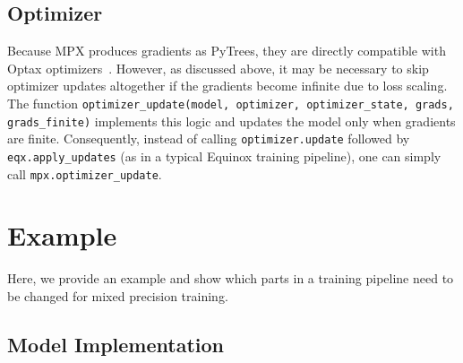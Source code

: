 \documentclass[10pt, a4paper, logo, onecolumn, internal, copyright]{dsme}
\begin{document}
\subsection{Optimizer}

Because MPX produces gradients as PyTrees, they are directly compatible with Optax optimizers~\cite{deepmind2020jax}. 
However, as discussed above, it may be necessary to skip optimizer updates altogether if the gradients become infinite due to loss scaling. 
The function \texttt{optimizer\_update(model, optimizer, optimizer\_state, grads, grads\_finite)} implements this logic and updates the model only when gradients are finite.
Consequently, instead of calling \texttt{optimizer.update} followed by \texttt{eqx.apply\_updates} (as in a typical Equinox training pipeline), one can simply call \texttt{mpx.optimizer\_update}.


\section{Example}
Here, we provide an example and show which parts in a training pipeline need to be changed for mixed precision training.

\subsection{Model Implementation}
\end{document}
